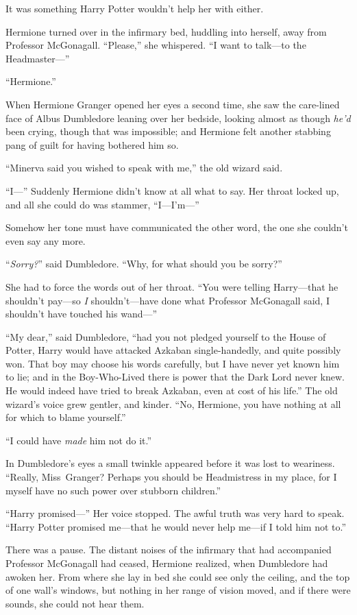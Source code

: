 It was something Harry Potter wouldn’t help her with either.

Hermione turned over in the infirmary bed, huddling into herself, away from Professor McGonagall. “Please,” she whispered. “I want to talk—to the Headmaster—”

\later

“Hermione.”

When Hermione Granger opened her eyes a second time, she saw the care-lined face of Albus Dumbledore leaning over her bedside, looking almost as though \emph{he’d} been crying, though that was impossible; and Hermione felt another stabbing pang of guilt for having bothered him so.

“Minerva said you wished to speak with me,” the old wizard said.

“I—” Suddenly Hermione didn’t know at all what to say. Her throat locked up, and all she could do was stammer, “I—I’m—”

Somehow her tone must have communicated the other word, the one she couldn’t even say any more.

“\emph{Sorry?}” said Dumbledore. “Why, for what should you be sorry?”

She had to force the words out of her throat. “You were telling Harry—that he shouldn’t pay—so \emph{I} shouldn’t—have done what Professor McGonagall said, I shouldn’t have touched his wand—”

“My dear,” said Dumbledore, “had you not pledged yourself to the House of Potter, Harry would have attacked Azkaban single-handedly, and quite possibly won. That boy may choose his words carefully, but I have never yet known him to lie; and in the Boy-Who-Lived there is power that the Dark Lord never knew. He would indeed have tried to break Azkaban, even at cost of his life.” The old wizard’s voice grew gentler, and kinder. “No, Hermione, you have nothing at all for which to blame yourself.”

“I could have \emph{made} him not do it.”

In Dumbledore’s eyes a small twinkle appeared before it was lost to weariness. “Really, Miss~Granger? Perhaps you should be Headmistress in my place, for I myself have no such power over stubborn children.”

“Harry promised—” Her voice stopped. The awful truth was very hard to speak. “Harry Potter promised me—that he would never help me—if I told him not to.”

There was a pause. The distant noises of the infirmary that had accompanied Professor McGonagall had ceased, Hermione realized, when Dumbledore had awoken her. From where she lay in bed she could see only the ceiling, and the top of one wall’s windows, but nothing in her range of vision moved, and if there were sounds, she could not hear them.

